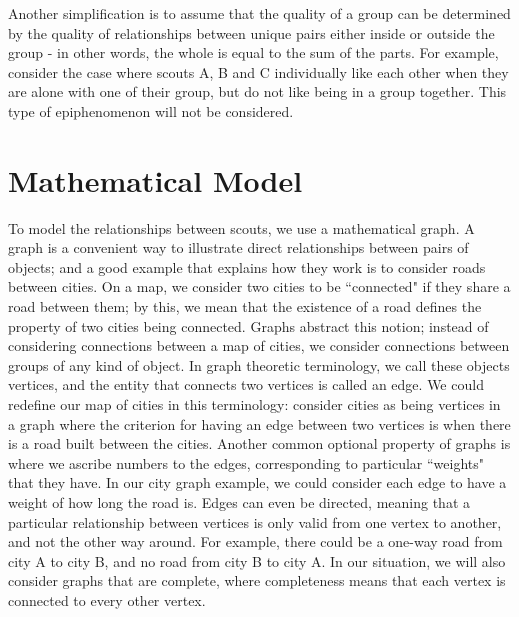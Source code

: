 \documentclass{amsart}
\theoremstyle{definition}
\theoremstyle{remark}
\numberwithin{equation}{section}
\begin{document}
Another simplification is to assume that the quality of a group can be determined by the quality of relationships between unique pairs either inside or outside the group - in other words, the whole is equal to the sum of the parts. For example, consider the case where scouts A, B and C individually like each other when they are alone with one of their group, but do not like being in a group together. This type of epiphenomenon will not be considered.

\section*{Mathematical Model}
To model the relationships between scouts, we use a mathematical graph. A graph is a convenient way to illustrate direct relationships between pairs of objects; and a good example that explains how they work is to consider roads between cities. On a map, we consider two cities to be ``connected" if they share a road between them; by this, we mean that the existence of a road defines the property of two cities being connected. Graphs abstract this notion; instead of considering connections between a map of cities, we consider connections between groups of any kind of object. In graph theoretic terminology, we call these objects vertices, and the entity that connects two vertices is called an edge. We could redefine our map of cities in this terminology: consider cities as being vertices in a graph where the criterion for having an edge between two vertices is when there is a road built between the cities. Another common optional property of graphs is where we ascribe numbers to the edges, corresponding to particular ``weights" that they have. In our city graph example, we could consider each edge to have a weight of how long the road is. Edges can even be directed, meaning that a particular relationship between vertices is only valid from one vertex to another, and not the other way around. For example, there could be a one-way road from city A to city B, and no road from city B to city A. In our situation, we will also consider graphs that are complete, where completeness means that each vertex is connected to every other vertex.
\end{document}
